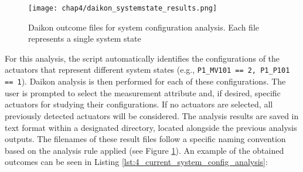 \begin{figure}[H]
	\centering
	\texttt{[image: chap4/daikon\_systemstate\_results.png]}
	\caption{Daikon outcome files for system configuration analysis. Each file represents a single system state}
	\label{fig:4_daikon_systemstates_files}
\end{figure}

For this analysis, the script automatically identifies the configurations of the actuators that represent different system states (e.g., \texttt{P1\_MV101 == 2, P1\_P101 == 1}). Daikon analysis is then performed for each of these configurations. The user is prompted to select the measurement attribute and, if desired, specific actuators for studying their configurations. If no actuators are selected, all previously detected actuators will be considered.\newline
The analysis results are saved in text format within a designated directory, located alongside the previous analysis outputs. The filenames of these result files follow a specific naming convention based on the analysis rule applied (see Figure \ref{fig:4_daikon_systemstates_files}).\newline \newline
An example of the obtained outcomes can be seen in Listing \ref{lst:4_current_system_config_analysis}:

